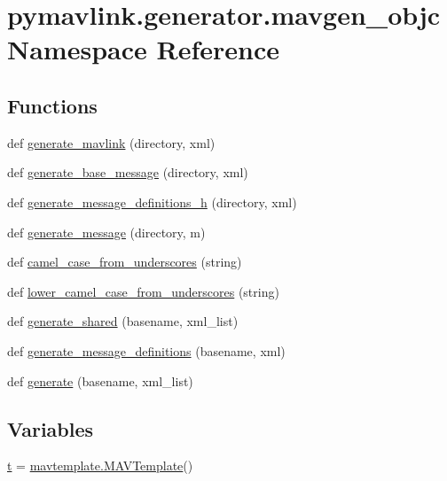 \hypertarget{namespacepymavlink_1_1generator_1_1mavgen__objc}{}\section{pymavlink.\+generator.\+mavgen\+\_\+objc Namespace Reference}
\label{namespacepymavlink_1_1generator_1_1mavgen__objc}
\subsection*{Functions}
\begin{DoxyCompactItemize}
\item 
def \mbox{\hyperlink{namespacepymavlink_1_1generator_1_1mavgen__objc_a029723100a1cc0db78017c05edbc66a9}{generate\+\_\+mavlink}} (directory, xml)
\item 
def \mbox{\hyperlink{namespacepymavlink_1_1generator_1_1mavgen__objc_a62689e6ef17a3f47ebe23fdb19258f4b}{generate\+\_\+base\+\_\+message}} (directory, xml)
\item 
def \mbox{\hyperlink{namespacepymavlink_1_1generator_1_1mavgen__objc_a2cf69803028e8d4f40edf1eeb561f996}{generate\+\_\+message\+\_\+definitions\+\_\+h}} (directory, xml)
\item 
def \mbox{\hyperlink{namespacepymavlink_1_1generator_1_1mavgen__objc_ab9050e3458fe8e9f6cc2210a66bd2b83}{generate\+\_\+message}} (directory, m)
\item 
def \mbox{\hyperlink{namespacepymavlink_1_1generator_1_1mavgen__objc_aadc6040b4b644298ef796c16cdabb42c}{camel\+\_\+case\+\_\+from\+\_\+underscores}} (string)
\item 
def \mbox{\hyperlink{namespacepymavlink_1_1generator_1_1mavgen__objc_ad0ae2d39d1f7d12c1178449325199d2d}{lower\+\_\+camel\+\_\+case\+\_\+from\+\_\+underscores}} (string)
\item 
def \mbox{\hyperlink{namespacepymavlink_1_1generator_1_1mavgen__objc_a677ef15fb3fb65545a5a589e513b7fe4}{generate\+\_\+shared}} (basename, xml\+\_\+list)
\item 
def \mbox{\hyperlink{namespacepymavlink_1_1generator_1_1mavgen__objc_a0976eb9b9b1af74699e2a1ecf5fef706}{generate\+\_\+message\+\_\+definitions}} (basename, xml)
\item 
def \mbox{\hyperlink{namespacepymavlink_1_1generator_1_1mavgen__objc_a2a6922cc4a5527ce0746314515c76438}{generate}} (basename, xml\+\_\+list)
\end{DoxyCompactItemize}
\subsection*{Variables}
\begin{DoxyCompactItemize}
\item 
\mbox{\hyperlink{namespacepymavlink_1_1generator_1_1mavgen__objc_a379787c6cbc3c99a94724d25039c0fbf}{t}} = \mbox{\hyperlink{classpymavlink_1_1generator_1_1mavtemplate_1_1MAVTemplate}{mavtemplate.\+M\+A\+V\+Template}}()
\end{DoxyCompactItemize}


